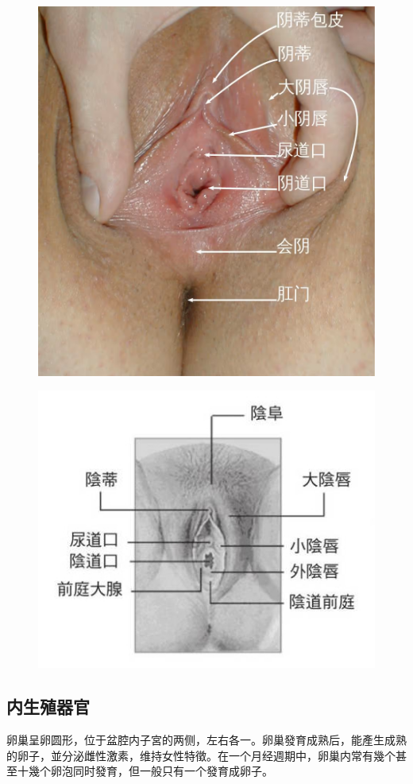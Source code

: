 \documentclass[12pt,UTF8]{ctexbook}
\begin{document}
\begin{figure}[htbp]
	\centering
	\includegraphics[width=0.7\linewidth]{1}
	\caption{}
	\label{fig:1}
\end{figure}

\begin{figure}[htbp]
	\centering
	\includegraphics[width=0.7\linewidth]{2}
	\caption{}
	\label{fig:1}
\end{figure}

\subsection{内生殖器官}

卵巢呈卵圆形，位于盆腔内子宮的两侧，左右各一。卵巢發育成熟后，能產生成熟的卵子，並分泌雌性激素，维持女性特徵。在一个月经週期中，卵巢内常有幾个甚至十幾个卵泡同时發育，但一般只有一个發育成卵子。
\end{document}
